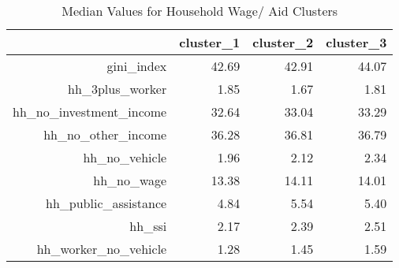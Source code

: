 \begin{table}[ht]
    \centering
    \caption{Median Values for Household Wage/ Aid Clusters}
    \label{tab:waid}
    \begin{tabular}{|r|r|r|r|}
      \hline
     & cluster\_1 & cluster\_2 & cluster\_3 \\ 
      \hline
    gini\_index & 42.69 & 42.91 & 44.07 \\ 
    \hline
      hh\_3plus\_worker & 1.85 & 1.67 & 1.81 \\ 
      \hline
      hh\_no\_investment\_income & 32.64 & 33.04 & 33.29 \\ 
      \hline
      hh\_no\_other\_income & 36.28 & 36.81 & 36.79 \\ 
      \hline
      hh\_no\_vehicle & 1.96 & 2.12 & 2.34 \\ 
      \hline
      hh\_no\_wage & 13.38 & 14.11 & 14.01 \\ 
      \hline
      hh\_public\_assistance & 4.84 & 5.54 & 5.40 \\ 
      \hline
      hh\_ssi & 2.17 & 2.39 & 2.51 \\ 
      \hline
      hh\_worker\_no\_vehicle & 1.28 & 1.45 & 1.59 \\ 
       \hline
    \end{tabular}
    \end{table}